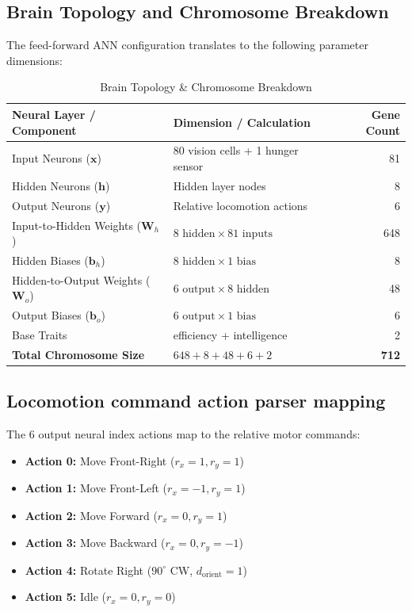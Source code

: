 \documentclass[11pt,a4paper]{article}
\begin{document}
\subsection{Brain Topology and Chromosome Breakdown}
The feed-forward ANN configuration translates to the following parameter dimensions:
\begin{table}[h]
\centering
\caption{Brain Topology \& Chromosome Breakdown}
\begin{tabular}{llr}
\toprule
\textbf{Neural Layer / Component} & \textbf{Dimension / Calculation} & \textbf{Gene Count} \\
\midrule
Input Neurons ($\mathbf{x}$) & 80 vision cells + 1 hunger sensor & 81 \\
Hidden Neurons ($\mathbf{h}$) & Hidden layer nodes & 8 \\
Output Neurons ($\mathbf{y}$) & Relative locomotion actions & 6 \\
\midrule
Input-to-Hidden Weights ($\mathbf{W}_h$) & $8\text{ hidden} \times 81\text{ inputs}$ & 648 \\
Hidden Biases ($\mathbf{b}_h$) & $8\text{ hidden} \times 1\text{ bias}$ & 8 \\
Hidden-to-Output Weights ($\mathbf{W}_o$) & $6\text{ output} \times 8\text{ hidden}$ & 48 \\
Output Biases ($\mathbf{b}_o$) & $6\text{ output} \times 1\text{ bias}$ & 6 \\
\midrule
Base Traits & efficiency + intelligence & 2 \\
\midrule
\textbf{Total Chromosome Size} & $648 + 8 + 48 + 6 + 2$ & \textbf{712} \\
\bottomrule
\end{tabular}
\end{table}

\subsection{Locomotion command action parser mapping}
The 6 output neural index actions map to the relative motor commands:
\begin{itemize}
    \item \textbf{Action 0:} Move Front-Right ($r_x = 1, r_y = 1$)
    \item \textbf{Action 1:} Move Front-Left ($r_x = -1, r_y = 1$)
    \item \textbf{Action 2:} Move Forward ($r_x = 0, r_y = 1$)
    \item \textbf{Action 3:} Move Backward ($r_x = 0, r_y = -1$)
    \item \textbf{Action 4:} Rotate Right ($90^\circ$ CW, $d_{\text{orient}} = 1$)
    \item \textbf{Action 5:} Idle ($r_x = 0, r_y = 0$)
\end{itemize}
\end{document}
